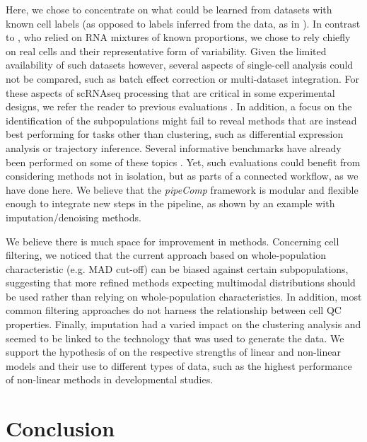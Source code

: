 \documentclass{bmcart}
\begin{document}
Here, we chose to concentrate on what could be learned from datasets with known cell labels (as opposed to labels inferred from the data, as in \citep{MereuCellAtlas2019}). In contrast to \citep{tianMixology2018}, who relied on RNA mixtures of known proportions, we chose to rely chiefly on real cells and their representative form of variability. Given the limited availability of such datasets however, several aspects of single-cell analysis could not be compared, such as batch effect correction or multi-dataset integration. For these aspects of scRNAseq processing that are critical in some experimental designs, we refer the reader to previous evaluations \citealp{TranBatch2020}. In addition, a focus on the identification of the subpopulations might fail to reveal methods that are instead best performing for tasks other than clustering, such as differential expression analysis or trajectory inference. Several informative benchmarks have already been performed on some of these topics \citealp{DalMolinDE2017, JaakkolaDE2017, SaelensTraject2019, SonesonDE2018}. Yet, such evaluations could benefit from considering methods not in isolation, but as parts of a connected workflow, as we have done here. We believe that the \textit{pipeComp} framework is modular and flexible enough to integrate new steps in the pipeline, as shown by an example with imputation/denoising methods.

We believe there is much space for improvement in methods. Concerning cell filtering, we noticed that the current approach based on whole-population characteristic (e.g. MAD cut-off) can be biased against certain subpopulations, suggesting that more refined methods expecting multimodal distributions should be used rather than relying on whole-population characteristics. In addition, most common filtering approaches do not harness the relationship between cell QC properties. Finally, imputation had a varied impact on the clustering analysis and seemed to be linked to the technology that was used to generate the data. We support the hypothesis of \citep{ZhangImput2018} on the respective strengths of linear and non-linear models and their use to different types of data, such as the highest performance of non-linear methods in developmental studies. 

\section*{Conclusion}
\end{document}
